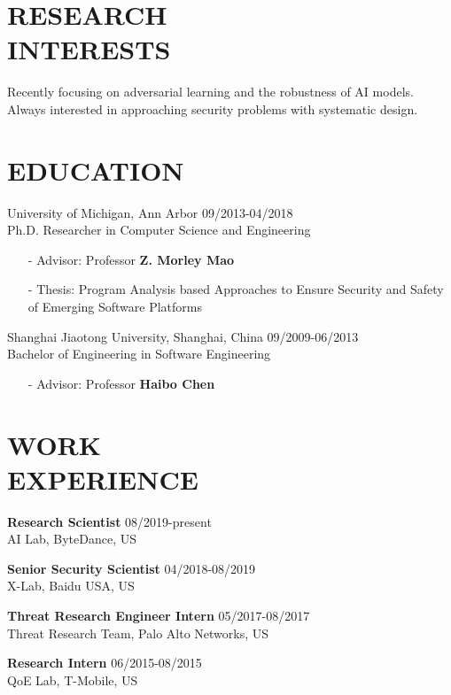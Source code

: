 \documentclass[margin]{res}
\begin{document}
\begin{resume}


\section{RESEARCH \\ INTERESTS}

Recently focusing on adversarial learning and the robustness of AI models. \\
Always interested in approaching security problems with systematic design. 

\section{EDUCATION} 
University of Michigan, Ann Arbor \hfill 09/2013-04/2018 \\
Ph.D. Researcher in Computer Science and Engineering
\begin{itemize}
\item[-] Advisor: Professor \textbf{Z. Morley Mao}
\item[-] Thesis: Program Analysis based Approaches to Ensure Security and Safety of Emerging Software Platforms
\end{itemize}

Shanghai Jiaotong University, Shanghai, China \hfill 09/2009-06/2013 \\
Bachelor of Engineering in Software Engineering
\begin{itemize}
\item[-] Advisor: Professor \textbf{Haibo Chen}
\end{itemize}

\section{WORK\\ EXPERIENCE}

\textbf{Research Scientist} \hfill 08/2019-present\\
AI Lab, ByteDance, US

\textbf{Senior Security Scientist} \hfill 04/2018-08/2019\\
X-Lab, Baidu USA, US

\textbf{Threat Research Engineer Intern} \hfill 05/2017-08/2017 \\
Threat Research Team, Palo Alto Networks, US

\textbf{Research Intern} \hfill 06/2015-08/2015 \\
QoE Lab, T-Mobile, US


\end{resume}
\end{document}
